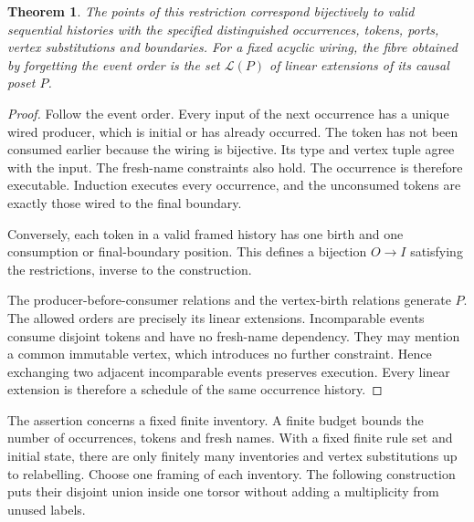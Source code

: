 \documentclass[11pt]{article}
\newtheorem{theorem}{Theorem}[section]
\theoremstyle{definition}
\newcommand{\Lin}{\mathcal L}
\numberwithin{equation}{section}
\begin{document}
\begin{theorem}\label{thm:history}
The points of this restriction correspond bijectively to valid
sequential histories with the specified distinguished occurrences,
tokens, ports, vertex substitutions and boundaries.
For a fixed acyclic wiring, the fibre obtained by forgetting the
event order is the set $\Lin(P)$ of linear extensions of its causal
poset $P$.
\end{theorem}
\begin{proof}
Follow the event order. Every input of the next occurrence has a
unique wired producer, which is initial or has already occurred.
The token has not been consumed earlier because the wiring is
bijective. Its type and vertex tuple agree with the input. The
fresh-name constraints also hold. The occurrence is therefore
executable. Induction executes every occurrence, and the unconsumed
tokens are exactly those wired to the final boundary.

Conversely, each token in a valid framed history has one birth and
one consumption or final-boundary position. This defines a bijection
$O\to I$ satisfying the restrictions, inverse to the construction.

The producer-before-consumer relations and the vertex-birth
relations generate $P$. The allowed orders are precisely its linear
extensions. Incomparable events consume disjoint tokens and have
no fresh-name dependency. They may mention a common immutable vertex,
which introduces no further constraint. Hence exchanging two adjacent
incomparable events preserves execution. Every linear extension is
therefore a schedule of the same occurrence history.
\end{proof}

The assertion concerns a fixed finite inventory. A finite budget
bounds the number of occurrences, tokens and fresh names. With a
fixed finite rule set and initial state, there are only finitely
many inventories and vertex substitutions up to relabelling.
Choose one framing of each inventory. The following construction
puts their disjoint union inside one torsor without adding a
multiplicity from unused labels.
\end{document}
